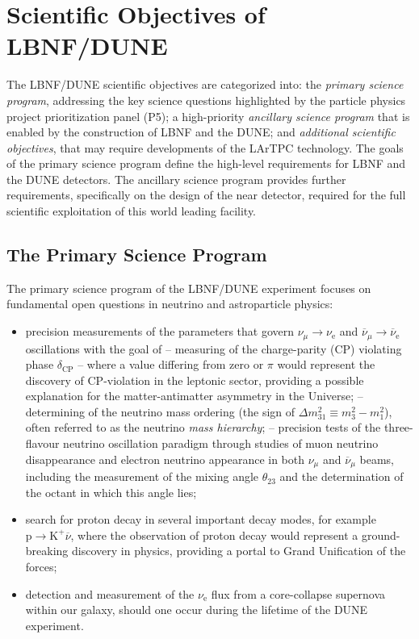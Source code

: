 \section{Scientific Objectives of LBNF/DUNE}

The LBNF/DUNE scientific objectives are categorized into: the {\it primary science program}, addressing the key science questions highlighted by the particle physics project prioritization panel (P5); 
a high-priority {\it ancillary science program} that is 
enabled by the construction of LBNF and the DUNE; and {\it additional scientific objectives}, that may require developments 
of the LArTPC technology. The goals of the primary science program define the high-level requirements for LBNF and the 
DUNE detectors. The ancillary science program provides further requirements, specifically on the design of the near 
detector, required for the full scientific exploitation of this world leading facility.

\subsection{The Primary Science Program}

The primary science program of the LBNF/DUNE experiment focuses on fundamental open questions in neutrino and astroparticle physics: 
\begin{itemize}
  \item precision measurements of the parameters that govern $\nu_{\mu} \rightarrow \nu_\text{e}$ and
           $\overline{\nu}_{\mu} \rightarrow \overline{\nu}_\text{e}$ oscillations with the goal of
  \subitem -- measuring of the charge-parity (CP) violating phase $\delta_\text{CP}$ -- where a value differing from zero or $\pi$ would represent the discovery of CP-violation in the leptonic sector, providing a possible explanation for the matter-antimatter asymmetry in the Universe;
  \subitem -- determining of the neutrino mass ordering (the sign of $\Delta m^2_{31} \equiv m_3^2-m_1^2$), often referred to as the neutrino {\it mass hierarchy};  
  \subitem -- precision tests of the three-flavour neutrino oscillation paradigm through studies of muon neutrino disappearance 
    and electron neutrino appearance in both $\nu_\mu$ and $\overline{\nu}_{\mu}$ beams, including the 
    measurement of the mixing angle $\theta_{23}$ and the determination of the octant in which this angle lies;
    \item search for proton decay in several important decay modes, for example $\text{p}\rightarrow\text{K}^+\overline{\nu}$, where the observation of proton decay would represent a ground-breaking discovery in physics, providing a portal to Grand Unification of the forces;
    \item detection and measurement of the $\nu_\text{e}$ flux from a core-collapse supernova within our galaxy, should one occur during the lifetime of the DUNE experiment.
\end{itemize}

